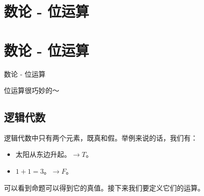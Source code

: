 
\def\sectionName{数论 - 位运算}



\isBeamerMode\relax
    \section[\TOCName]{\sectionName}
\fi
\isBeamerMode\relax
    \section[\TOCName\ -\ \sectionName]{\sectionName}
\fi

\begin{frame}

\isBeamerMode\relax
    {\Huge \sectionName}\par
\fi




位运算很巧妙的～



\end{frame}

\subsection{逻辑代数}
\begin{frame} %
逻辑代数中只有两个元素，既真和假。举例来说的话，我们有：
\begin{itemize}
    \item 太阳从东边升起。\pause $\to T$。
    \item $1 + 1 = 3$。\pause $\to F$。
\end{itemize}

可以看到命题可以得到它的真值。接下来我们要定义它们的运算。
\end{frame}

